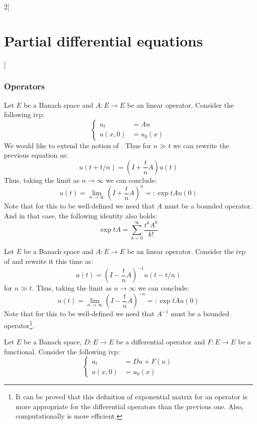 \documentclass[../../../main_math.tex]{subfiles}
\begin{document}
\begin{multicols}{2}[\section{Partial differential equations}]
  \subsubsection{Operators}
  \begin{definition}
    Let $E$ be a Banach space and $A:E\rightarrow E$ be an linear operator. Consider the following ivp:
    \begin{equation}\label{PDE:operatorpde}
      \left\{
      \begin{aligned}
        u_{t}  & =A u    \\
        u(x,0) & =u_0(x)
      \end{aligned}
      \right.
    \end{equation}
    We would like to extend the notion of . Thus for $n\gg t$ we can rewrite the previous equation as:
    $$u(t +t/n)= \left(I+\frac{t}{n}A\right)u(t)$$
    Thus, taking the limit as $n\to \infty$ we can conclude: $$u(t)=\lim_{n\to\infty}{\left(I+\frac{t}{n}A\right)}^n=:\exp{tA}u(0)$$
    Note that for this to be well-defined we need that $A$ must be a bounded operator. And in that case, the following identity also holds: $$\exp{tA}=\sum_{k=0}^\infty\frac{t^kA^k}{k!}$$
  \end{definition}
  \begin{definition}
    Let $E$ be a Banach space and $A:E\rightarrow E$ be an linear operator. Consider the ivp of  and rewrite it this time as:
    $$ u(t)= {\left(I-\frac{t}{n}A\right)}^{-1}u(t-t/n)$$
    for $n\gg t$.
    Thus, taking the limit as $n\to \infty$ we can conclude: $$u(t)=\lim_{n\to\infty}{\left(I-\frac{t}{n}A\right)}^{-n}=:\exp{tA}u(0)$$
    Note that for this to be well-defined we need that $A^{-1}$ must be a bounded operator\footnote{It can be proved that this definition of exponential matrix for an operator is more appropriate for the differential operators than the previous one. Also, computationally is more efficient.}.
  \end{definition}
  \begin{proposition}
    Let $E$ be a Banach space, $D:E\rightarrow E$ be a differential operator and $F:E\rightarrow E$ be a functional. Consider the following ivp:
    \begin{equation}
      \left\{
      \begin{aligned}
        u_{t}  & =D u +F(u) \\
        u(x,0) & =u_0(x)
      \end{aligned}

\end{equation}
\end{proposition}
\end{multicols}
\end{document}
